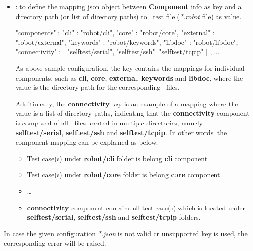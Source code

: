 \begin{itemize}
\begin{itemize}
\begin{itemize}
                      for all test casea within this execution.
\begin{robotcode}
{
  "components" : "atest",
  ...
}
\end{robotcode}
                \item {}: to define the mapping json object between 
                      \textbf{Component} info as key and a directory path (or 
                      list of directory paths) to \rfwcore\ test file 
                      (\emph{*.robot} file) as value.
\begin{robotcode}
  {
    "components" : {
      "cli"       : "robot/cli",
      "core"      : "robot/core",
      "external"  : "robot/external",
      "keywords"  : "robot/keywords",
      "libdoc"    : "robot/libdoc",
      "connectivity" : [
          "selftest/serial",
          "selftest/ssh",
          "selftest/tcpip"
      ]
    },
    ...
  }
\end{robotcode}
                As above sample configuration, the  key 
                contains the mappings for individual components, such as 
                \textbf{cli}, \textbf{core}, \textbf{external}, 
                \textbf{keywords} and \textbf{libdoc}, where the value is the 
                directory path for the corresponding \rfwcore\ files.

                Additionally, the \textbf{connectivity} key is an example of a 
                mapping where the value is a list of directory paths, indicating 
                that the \textbf{connectivity} component is composed of all
                \rfwcore\ files located in multiple directories, namely 
                \textbf{selftest/serial}, \textbf{selftest/ssh} and 
                \textbf{selftest/tcpip}.
                \newline
                In other words, the component mapping can be explained as below:
                \begin{itemize}
                  \item Test case(s) under \textbf{robot/cli} folder is belong 
                        \textbf{cli} component
                  \item Test case(s) under \textbf{robot/core} folder is belong 
                        \textbf{core} component
                  \item \dots
                  \item \textbf{connectivity} component contains all test case(s)
                        which is located under \textbf{selftest/serial}, 
                        \textbf{selftest/ssh} and \textbf{selftest/tcpip} folders.
                \end{itemize}
              \end{itemize}
          \end{itemize}

          In case the given configuration \emph{*.json} is not valid or 
          unsupported key is used, the corresponding error will be raised.
      \end{itemize}

